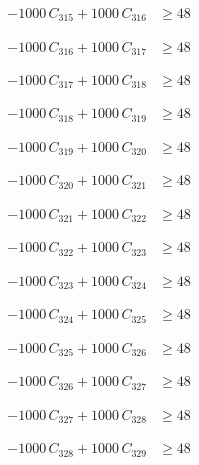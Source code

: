 \documentclass[a4paper,11pt]{article}
\begin{document}
\begin{align}
-1000\,C_{315} + 1000\,C_{316} &\geq 48 \nonumber
\end{align}

\begin{align}
-1000\,C_{316} + 1000\,C_{317} &\geq 48 \nonumber
\end{align}

\begin{align}
-1000\,C_{317} + 1000\,C_{318} &\geq 48 \nonumber
\end{align}

\begin{align}
-1000\,C_{318} + 1000\,C_{319} &\geq 48 \nonumber
\end{align}

\begin{align}
-1000\,C_{319} + 1000\,C_{320} &\geq 48 \nonumber
\end{align}

\begin{align}
-1000\,C_{320} + 1000\,C_{321} &\geq 48 \nonumber
\end{align}

\begin{align}
-1000\,C_{321} + 1000\,C_{322} &\geq 48 \nonumber
\end{align}

\begin{align}
-1000\,C_{322} + 1000\,C_{323} &\geq 48 \nonumber
\end{align}

\begin{align}
-1000\,C_{323} + 1000\,C_{324} &\geq 48 \nonumber
\end{align}

\begin{align}
-1000\,C_{324} + 1000\,C_{325} &\geq 48 \nonumber
\end{align}

\begin{align}
-1000\,C_{325} + 1000\,C_{326} &\geq 48 \nonumber
\end{align}

\begin{align}
-1000\,C_{326} + 1000\,C_{327} &\geq 48 \nonumber
\end{align}

\begin{align}
-1000\,C_{327} + 1000\,C_{328} &\geq 48 \nonumber
\end{align}

\begin{align}
-1000\,C_{328} + 1000\,C_{329} &\geq 48 \nonumber
\end{align}
\end{document}
